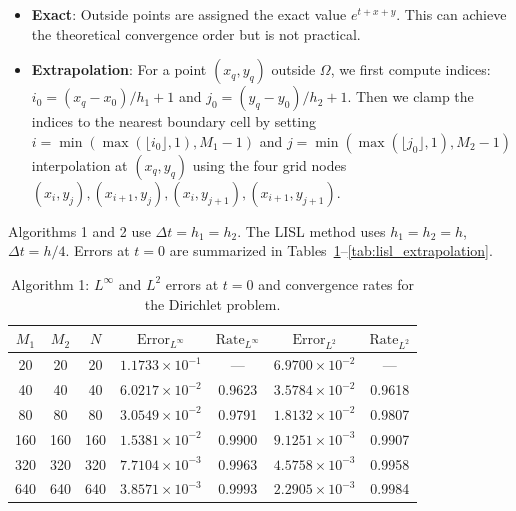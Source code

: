 \documentclass[11pt]{article}
\theoremstyle{mythm}
\theoremstyle{definition}
\begin{document}
	\begin{itemize}
		\item \textbf{Exact}:  
		Outside points are assigned the exact value $e^{t+x+y}$.  
		This can achieve the theoretical convergence order but is not practical.
		
		\item \textbf{Extrapolation}:  
		For a point $(x_q, y_q)$ outside $\Omega$, we first compute  indices:
		$i_0 = (x_q - x_{0})/h_1 + 1$ and $j_0 = (y_q - y_{0})/h_2 + 1$. 
		Then we clamp the indices to the nearest boundary cell by setting 
		$i = \min(\max(\lfloor i_0 \rfloor, 1), M_1-1)$ and $j = \min(\max(\lfloor j_0 \rfloor, 1), M_2-1)$ interpolation at $(x_q, y_q)$ using the four grid nodes 
		$(x_i, y_j), (x_{i+1}, y_j), (x_i, y_{j+1}), (x_{i+1}, y_{j+1})$. 
	\end{itemize}
	
	
	
	Algorithms 1 and 2 use $\Delta t=h_1=h_2$.  
	The LISL method uses $h_1=h_2=h$,$\Delta t=h/4$.  
	Errors at $t=0$ are summarized in Tables~\ref{tab:dirichlet_explicit}--\ref{tab:lisl_extrapolation}.
	
	\begin{table}[htb]
		\centering
		\caption{Algorithm 1: $L^\infty$ and $L^2$ errors at $t=0$ and convergence rates for the Dirichlet problem.}
		\label{tab:dirichlet_explicit}
		\small
		\begin{tabular}{ccccccc}
			\hline
			$M_1$ & $M_2$ & $N$ & $\text{Error}_{L^{\infty}}$ & $\text{Rate}_{L^{\infty}}$ & $\text{Error}_{L^{2}}$ & $\text{Rate}_{L^{2}}$ \\
			\hline
			20  & 20  & 20  & $1.1733 \times 10^{-1}$ & ---    & $6.9700 \times 10^{-2}$ & ---    \\
			40  & 40  & 40  & $6.0217 \times 10^{-2}$ & 0.9623 & $3.5784 \times 10^{-2}$ & 0.9618 \\
			80  & 80  & 80  & $3.0549 \times 10^{-2}$ & 0.9791 & $1.8132 \times 10^{-2}$ & 0.9807 \\
			160 & 160 & 160 & $1.5381 \times 10^{-2}$ & 0.9900 & $9.1251 \times 10^{-3}$ & 0.9907 \\
			320 & 320 & 320 & $7.7104 \times 10^{-3}$ & 0.9963 & $4.5758 \times 10^{-3}$ & 0.9958 \\
			640 & 640 & 640 & $3.8571 \times 10^{-3}$ & 0.9993 & $2.2905 \times 10^{-3}$ & 0.9984 \\
			\hline
		\end{tabular}
	\end{table}
	
\end{document}
